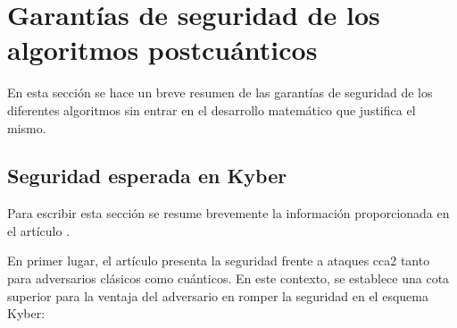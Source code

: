 \section{Garantías de seguridad de los algoritmos postcuánticos}
En esta sección se hace un breve resumen de las garantías de seguridad de los diferentes algoritmos sin entrar en el desarrollo matemático que justifica el mismo.
\subsection{Seguridad esperada en Kyber}
Para escribir esta sección se resume brevemente la información proporcionada en el artículo \cite{kyber-spec-2021}.
\newline

En primer lugar, el artículo presenta la seguridad frente a ataques \acrshort{cca2} tanto para adversarios clásicos como cuánticos. En este contexto, se establece una cota superior para la ventaja del adversario en romper la seguridad en el esquema Kyber:
